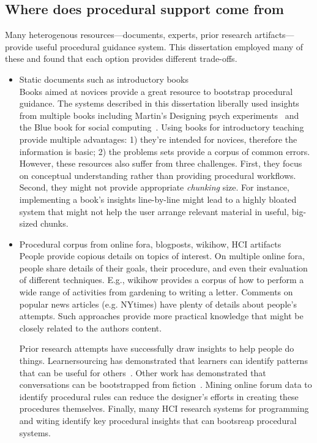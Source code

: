 \subsection{Where does procedural support come from}
Many heterogenous resources---documents, experts, prior research artifacts---provide useful procedural guidance system. This dissertation employed many of these and found that each option provides different trade-offs.

\begin{itemize}
\item Static documents such as introductory books\\
Books aimed at novices provide a great resource to bootstrap procedural guidance. The systems described in this dissertation liberally used insights from multiple books including Martin’s Designing psych experiments~\cite{Martin2007} and the Blue book for social computing~\cite{Resnick2011}. Using books for introductory teaching provide multiple advantages: 1) they're intended for novices, therefore the information is basic; 2) the problems sets provide a corpus of common errors. However, these resources also suffer from three challenges. First, they focus on conceptual understanding rather than providing procedural workflows. Second, they might not provide appropriate \textit{chunking} size. For instance, implementing a book's insights line-by-line might lead to a highly bloated system that might not help the user arrange relevant material in useful, big-sized chunks. 

\item Procedural corpus from online fora, blogposts, wikihow, HCI artifacts\\
People provide copious details on topics of interest. On multiple online fora, people share details of their goals, their procedure, and even their evaluation of different techniques. E.g., wikihow provides a corpus of how to perform a wide range of activities from gardening to writing a letter. Comments on popular news articles (e.g. NYtimes) have plenty of details about people's attempts. Such approaches provide more practical knowledge that might be closely related to the author\textquotesingle s content. 

Prior research attempts have successfully draw insights to help people do things. Learnersourcing has demonstrated that learners can identify patterns that can be useful for others~\cite{Kim2015f}. Other work has demonstrated that conversations can be bootstrapped from fiction~\cite{fast2016empath}. Mining online forum data to identify procedural rules can reduce the designer's efforts in creating these procedures themselves. Finally, many HCI research systems for programming and witing identify key procedural insights that can bootsreap procedural systems. 


\end{itemize}
